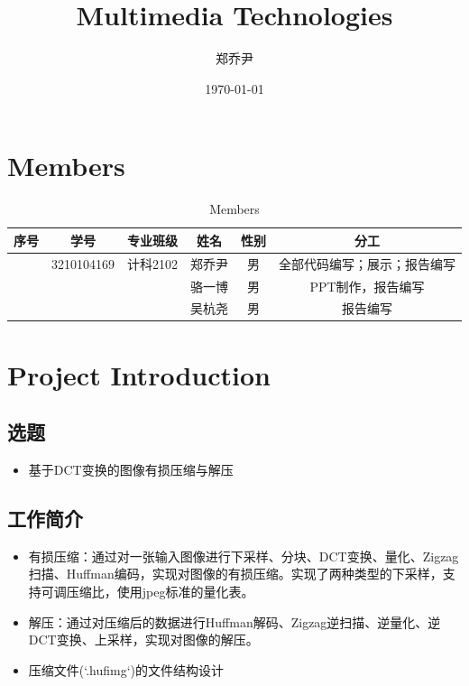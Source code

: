 \documentclass{article}
\title{Multimedia Technologies}
\author{郑乔尹}
\date{\today}
\begin{document}
\maketitle

\section{Members}

\begin{table}[htbp]
    \centering
    \begin{tabular}{|c|c|c|c|c|c|}
        \hline
        序号 & 学号 & 专业班级 & 姓名 & 性别 & 分工 \\
        \hline
        & 3210104169 & 计科2102 & 郑乔尹 & 男 & 全部代码编写；展示；报告编写 \\
        \hline
        & & & 骆一博 & 男 & PPT制作，报告编写 \\
        \hline
        & & & 吴杭尧 & 男 & 报告编写 \\
        \hline
    \end{tabular}
    \caption{Members}
\end{table}


\section{Project Introduction}

\subsection{选题}

\begin{itemize}
    \item 基于DCT变换的图像有损压缩与解压
\end{itemize}

\subsection{工作简介}

\begin{itemize}
    \item 有损压缩：通过对一张输入图像进行下采样、分块、DCT变换、量化、Zigzag扫描、Huffman编码，实现对图像的有损压缩。实现了两种类型的下采样，支持可调压缩比，使用jpeg标准的量化表。
    \item 解压：通过对压缩后的数据进行Huffman解码、Zigzag逆扫描、逆量化、逆DCT变换、上采样，实现对图像的解压。
    \item 压缩文件(`.hufimg`)的文件结构设计
\end{itemize}
\end{document}
